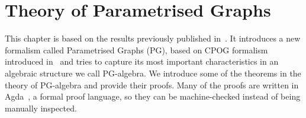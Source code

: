 

\usepackage{amstext}
\usepackage{amssymb}
\usepackage{stmaryrd}


\newcommand{\redFG}[1]{\textcolor[rgb]{0.6,0,0}{#1}}
\newcommand{\greenFG}[1]{\textcolor[rgb]{0,0.4,0}{#1}}
\newcommand{\blueFG}[1]{\textcolor[rgb]{0,0,0.8}{#1}}
\newcommand{\orangeFG}[1]{\textcolor[rgb]{0.8,0.4,0}{#1}}
\newcommand{\purpleFG}[1]{\textcolor[rgb]{0.4,0,0.4}{#1}}
\newcommand{\yellowFG}[1]{\textcolor{yellow}{#1}}
\newcommand{\brownFG}[1]{\textcolor[rgb]{0.5,0.2,0.2}{#1}}
\newcommand{\blackFG}[1]{\textcolor[rgb]{0,0,0}{#1}}
\newcommand{\whiteFG}[1]{\textcolor[rgb]{1,1,1}{#1}}
\newcommand{\yellowBG}[1]{\colorbox[rgb]{1,1,0.2}{#1}}
\newcommand{\brownBG}[1]{\colorbox[rgb]{1.0,0.7,0.4}{#1}}

\newcommand{\ColourStuff}{
  \newcommand{\red}{\redFG}
  \newcommand{\green}{\greenFG}
  \newcommand{\blue}{\blueFG}
  \newcommand{\orange}{\orangeFG}
  \newcommand{\purple}{\purpleFG}
  \newcommand{\yellow}{\yellowFG}
  \newcommand{\brown}{\brownFG}
  \newcommand{\black}{\blackFG}
  \newcommand{\white}{\whiteFG}
}

\newcommand{\MonochromeStuff}{
  \newcommand{\red}{\blackFG}
  \newcommand{\green}{\blackFG}
  \newcommand{\blue}{\blackFG}
  \newcommand{\orange}{\blackFG}
  \newcommand{\purple}{\blackFG}
  \newcommand{\yellow}{\blackFG}
  \newcommand{\brown}{\blackFG}
  \newcommand{\black}{\blackFG}
  \newcommand{\white}{\blackFG}
}

\ColourStuff

\newcommand{\K}[1]{\yellow{\mathsf{#1}}}
\newcommand{\Q}[1]{\green{\mathsf{#1}}}
\newcommand{\D}[1]{\blue{\mathsf{#1}}}
\newcommand{\C}[1]{\red{\mathsf{#1}}}
\newcommand{\F}[1]{\green{\mathsf{#1}}}
\newcommand{\V}[1]{\purple{\mathit{#1}}}

\newcommand{\dfeq}{\overset{\mathrm{df}}{=}}


\chapter{Theory of Parametrised Graphs}

This chapter is based on the results previously published in~\cite{pg_algebra}. 
It introduces a new formalism called Parametrised Graphs (PG), 
based on CPOG formalism introduced in~\cite{2010_mokhov_ieee} and tries to capture its 
most important characteristics in an algebraic structure we call PG-algebra.
We introduce some of the theorems in the theory of PG-algebra and provide their proofs.
Many of the proofs are written in Agda~\cite{norell:thesis}, a formal proof language,
so they can be machine-checked instead of being manually inspected.

